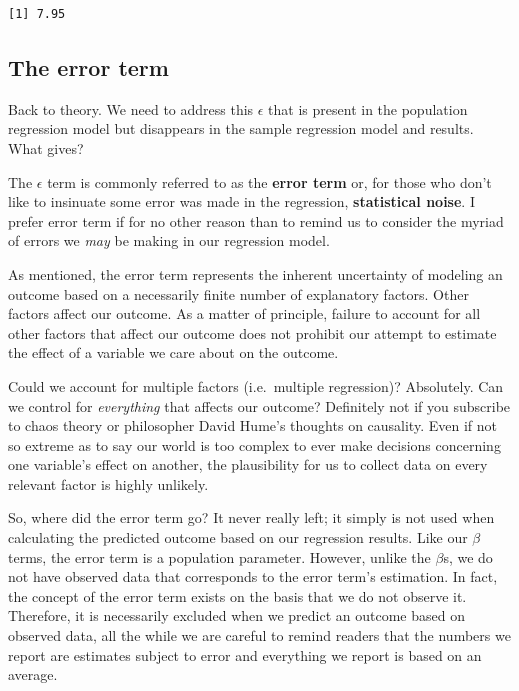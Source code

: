 \documentclass[
]{book}
\begin{document}
\begin{verbatim}
[1] 7.95
\end{verbatim}

\hypertarget{the-error-term}{%
\subsection{The error term}\label{the-error-term}}

Back to theory. We need to address this \(\epsilon\) that is present in the population regression model but disappears in the sample regression model and results. What gives?

The \(\epsilon\) term is commonly referred to as the \textbf{error term} or, for those who don't like to insinuate some error was made in the regression, \textbf{statistical noise}. I prefer error term if for no other reason than to remind us to consider the myriad of errors we \emph{may} be making in our regression model.

As mentioned, the error term represents the inherent uncertainty of modeling an outcome based on a necessarily finite number of explanatory factors. Other factors affect our outcome. As a matter of principle, failure to account for all other factors that affect our outcome does not prohibit our attempt to estimate the effect of a variable we care about on the outcome.

Could we account for multiple factors (i.e.~multiple regression)? Absolutely. Can we control for \emph{everything} that affects our outcome? Definitely not if you subscribe to chaos theory or philosopher David Hume's thoughts on causality. Even if not so extreme as to say our world is too complex to ever make decisions concerning one variable's effect on another, the plausibility for us to collect data on every relevant factor is highly unlikely.

So, where did the error term go? It never really left; it simply is not used when calculating the predicted outcome based on our regression results. Like our \(\beta\) terms, the error term is a population parameter. However, unlike the \(\beta\)s, we do not have observed data that corresponds to the error term's estimation. In fact, the concept of the error term exists on the basis that we do not observe it. Therefore, it is necessarily excluded when we predict an outcome based on observed data, all the while we are careful to remind readers that the numbers we report are estimates subject to error and everything we report is based on an average.
\end{document}
